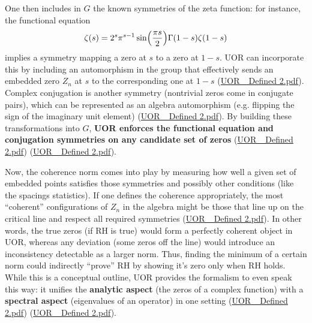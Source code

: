 \documentclass[12pt]{article}
\begin{document}
One then includes in $G$ the known symmetries of the zeta function: for instance, the functional equation 
\[
\zeta(s) = 2^s \pi^{s-1}\sin\Bigl(\frac{\pi s}{2}\Bigr)\Gamma(1-s)\zeta(1-s)
\]
implies a symmetry mapping a zero at $s$ to a zero at $1-s$. UOR can incorporate this by including an automorphism in the group that effectively sends an embedded zero $Z_n$ at $s$ to the corresponding one at $1-s$ (\href{file://file-TBF3nHDaRR5QeVMmwCFYkp#:~:text=%24g_,H%24%20perhaps%20containing%20the%20inversion}{UOR\_ Defined 2.pdf}). Complex conjugation is another symmetry (nontrivial zeros come in conjugate pairs), which can be represented as an algebra automorphism (e.g. flipping the sign of the imaginary unit element) (\href{file://file-TBF3nHDaRR5QeVMmwCFYkp#:~:text=zeros%20come%20as%20conjugate%20pairs%29,this%20as%20an%20element%20of}{UOR\_ Defined 2.pdf}). By building these transformations into $G$, \textbf{UOR enforces the functional equation and conjugation symmetries on any candidate set of zeros} (\href{file://file-TBF3nHDaRR5QeVMmwCFYkp#:~:text=might%20be%20the%20Riemann%20dynamics,could%20be%20implemented%20as%20an}{UOR\_ Defined 2.pdf}) (\href{file://file-TBF3nHDaRR5QeVMmwCFYkp#:~:text=%241,symmetry%20and%20perhaps%20the%20conjectured}{UOR\_ Defined 2.pdf}).

\medskip

Now, the coherence norm comes into play by measuring how well a given set of embedded points satisfies those symmetries and possibly other conditions (like the spacings statistics). If one defines the coherence appropriately, the most ``coherent'' configurations of $Z_n$ in the algebra might be those that line up on the critical line and respect all required symmetries (\href{file://file-TBF3nHDaRR5QeVMmwCFYkp#:~:text=1,behavior%20in%20one%20algebraic%20structure}{UOR\_ Defined 2.pdf}). In other words, the true zeros (if RH is true) would form a perfectly coherent object in UOR, whereas any deviation (some zeros off the line) would introduce an inconsistency detectable as a larger norm. Thus, finding the minimum of a certain norm could indirectly ``prove'' RH by showing it’s zero only when RH holds. While this is a conceptual outline, UOR provides the formalism to even speak this way: it unifies the \textbf{analytic aspect} (the zeros of a complex function) with a \textbf{spectral aspect} (eigenvalues of an operator) in one setting (\href{file://file-TBF3nHDaRR5QeVMmwCFYkp#:~:text=%E2%97%8F%20Spectral%20Problems%20,Candidate.pdf%29%2C%20and%20similarly}{UOR\_ Defined 2.pdf}) (\href{file://file-TBF3nHDaRR5QeVMmwCFYkp#:~:text=structure%20%28uor,sets%20into%20the%20same%20Clifford}{UOR\_ Defined 2.pdf}).
\end{document}
